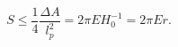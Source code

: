 \begin{equation}
S\leq \frac{1}{4}\frac{\Delta A}{l_{p}^{2}}=2\pi EH_{0}^{-1}=2\pi Er.
\end{equation}

